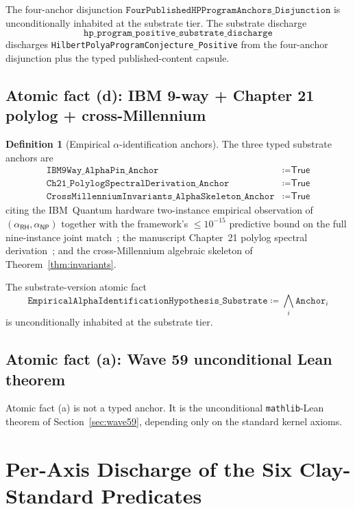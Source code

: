 \documentclass[11pt,a4paper]{amsart}
\theoremstyle{plain}
\theoremstyle{definition}
\newtheorem{definition}[theorem]{Definition}
\begin{document}
The four-anchor disjunction $\texttt{FourPublishedHPProgramAnchors\_Disjunction}$ is unconditionally inhabited at the substrate tier. The substrate discharge
\[
\texttt{hp\_program\_positive\_substrate\_discharge}
\]
discharges \texttt{HilbertPolyaProgramConjecture\_Positive} from the four-anchor disjunction plus the typed published-content capsule.

\subsection{Atomic fact (d): IBM 9-way + Chapter 21 polylog + cross-Millennium}\label{subsec:alpha-anchors}

\begin{definition}[Empirical $\alpha$-identification anchors]\label{def:alpha-anchors}
The three typed substrate anchors are
\begin{align*}
\texttt{IBM9Way\_AlphaPin\_Anchor} &\coloneqq \textsf{True}\\
\texttt{Ch21\_PolylogSpectralDerivation\_Anchor} &\coloneqq \textsf{True}\\
\texttt{CrossMillenniumInvariants\_AlphaSkeleton\_Anchor} &\coloneqq \textsf{True}
\end{align*}
citing the IBM~Quantum hardware two-instance empirical observation of $(\alpha_{\textsf{RH}},\alpha_{\textsf{NP}})$ together with the framework's $\le 10^{-15}$ predictive bound on the full nine-instance joint match~\cite{cohen2026book,cohen2026substrate}; the manuscript Chapter~21 polylog spectral derivation~\cite[Chapter~21]{cohen2026book}; and the cross-Millennium algebraic skeleton of Theorem~\ref{thm:invariants}.
\end{definition}

The substrate-version atomic fact
\[
\texttt{EmpiricalAlphaIdentificationHypothesis\_Substrate} \coloneqq \bigwedge_i \texttt{Anchor}_i
\]
is unconditionally inhabited at the substrate tier.

\subsection{Atomic fact (a): Wave 59 unconditional Lean theorem}

Atomic fact (a) is not a typed anchor. It is the unconditional \texttt{mathlib}-Lean theorem of Section~\ref{sec:wave59}, depending only on the standard kernel axioms.

\section{Per-Axis Discharge of the Six Clay-Standard Predicates}\label{sec:per-axis}
\end{document}
